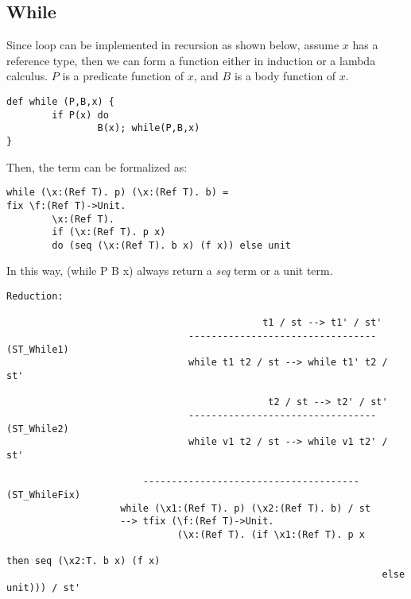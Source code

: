 \subsection{While}
Since \while loop can be implemented in recursion as shown below, assume $x$ has a reference type, then we can form a \while function either in induction or a lambda calculus. $P$ is a predicate function of $x$, and $B$ is a body function of $x$.
\begin{lstlisting}
def while (P,B,x) {
		if P(x) do
				B(x); while(P,B,x)
}
\end{lstlisting}
Then, the \while term can be formalized as:
\begin{lstlisting}
while (\x:(Ref T). p) (\x:(Ref T). b) =
fix \f:(Ref T)->Unit. 
		\x:(Ref T). 
		if (\x:(Ref T). p x) 
		do (seq (\x:(Ref T). b x) (f x)) else unit
\end{lstlisting}
In this way, (while P B x) always return a \textit{seq} term or a unit term. 
\begin{lstlisting}
Reduction:

										     t1 / st --> t1' / st'
								--------------------------------- (ST_While1)
								while t1 t2 / st --> while t1' t2 / st'
								
											  t2 / st --> t2' / st'
								--------------------------------- (ST_While2)
								while v1 t2 / st --> while v1 t2' / st'
								
						-------------------------------------- (ST_WhileFix)
					while (\x1:(Ref T). p) (\x2:(Ref T). b) / st 
					--> tfix (\f:(Ref T)->Unit. 
					       	  (\x:(Ref T). (if \x1:(Ref T). p x
																	then seq (\x2:T. b x) (f x)
																  else unit))) / st'
\end{lstlisting}


